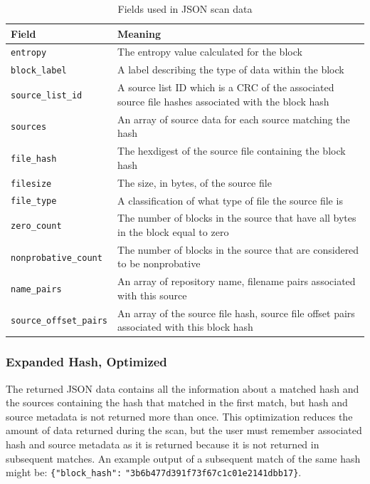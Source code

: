 \documentclass[11pt,fleqn]{article} %
\begin{document}
\begin{table}[!ht]

\centering
\caption{Fields used in JSON scan data}
\label{tab:JSONScanDataExpanded}
\begin{tabular}{|p{5 cm}|p{8.8 cm}|}
\hline \hline
\textbf{Field} & \textbf{Meaning} \\
\hline
\verb+entropy+ & The entropy value calculated for the block\\
\hline
\verb+block_label+ & A label describing the type of data within the block\\
\hline
\verb+source_list_id+ & A source list ID which is a CRC of the associated source file hashes associated with the block hash\\
\hline
\verb+sources+ & An array of source data for each source matching the hash\\
\hline
\verb+file_hash+ & The hexdigest of the source file containing the block hash\\
\hline
\verb+filesize+ & The size, in bytes, of the source file\\
\hline
\verb+file_type+ & A classification of what type of file the source file is\\
\hline
\verb+zero_count+ & The number of blocks in the source that have all bytes in the block equal to zero\\
\hline
\verb+nonprobative_count+ & The number of blocks in the source that are considered to be nonprobative\\
\hline
\verb+name_pairs+ & An array of repository name, filename pairs associated with this source\\
\hline
\verb+source_offset_pairs+ & An array of the source file hash, source file offset pairs associated with this block hash\\
\hline
\end{tabular}
\end{table}

\subsubsection{Expanded Hash, Optimized}
The returned JSON data contains all the information about a matched hash and the sources containing the hash that matched in the first match, but hash and source metadata is not returned more than once. This optimization reduces the amount of data returned during the scan, but the user must remember associated hash and source metadata as it is returned because it is not returned in subsequent matches. An example output of a subsequent match of the same hash might be: \verb+{"block_hash":+ \verb+"3b6b477d391f73f67c1c01e2141dbb17}+.\\
\end{document}
